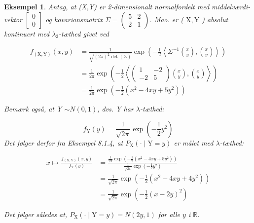 \documentclass{article}
\newcommand{\1}{\mathbbm{1}}
\theoremstyle{boxed}
\newtheorem{example}[theorem]{Eksempel}
\begin{document}
\begin{example}
    Antag, at (X,Y) er 2-dimensionalt normalfordelt med middelværdi-vektor $\left[\begin{array}{l}0 \\ 0\end{array}\right]$ og kovariansmatrix $\Sigma=\left(\begin{array}{ll}5 & 2 \\ 2 & 1\end{array}\right)$.
Mao. er ( $\mathrm{X}, \mathrm{Y}$ ) absolut kontinuert med $\lambda_2$-tæthed givet ved

$$
\begin{aligned}
f_{(\mathrm{X}, \mathrm{Y})}(x, y) & =\frac{1}{\sqrt{(2 \pi)^2 \operatorname{det}(\Sigma)}} \exp \left(-\frac{1}{2}\left\langle\Sigma^{-1}\binom{x}{y},\binom{x}{y}\right\rangle\right) \\
& =\frac{1}{2 \pi} \exp \left(-\frac{1}{2}\left\langle\left(\begin{array}{cc}
1 & -2 \\
-2 & 5
\end{array}\right)\binom{x}{y},\binom{x}{y}\right\rangle\right) \\
& =\frac{1}{2 \pi} \exp \left(-\frac{1}{2}\left(x^2-4 x y+5 y^2\right)\right)
\end{aligned}
$$


Bemærk også, at Y $\sim N(0,1)$, dvs. Y har $\lambda$-tæthed:

$$
f_{\mathrm{Y}}(y)=\frac{1}{\sqrt{2 \pi}} \exp \left(-\frac{1}{2} y^2\right)
$$
Det følger derfor fra Eksempel 8.1.4, at $P_{\mathrm{X}}(\cdot \mid \mathrm{Y}=y)$ er målet med $\lambda$-tæthed:

$$
\begin{aligned}
x \mapsto \frac{f_{(\mathrm{X}, \mathrm{Y})}(x, y)}{f_{\mathrm{Y}}(y)} & =\frac{\frac{1}{2 \pi} \exp \left(-\frac{1}{2}\left(x^2-4 x y+5 y^2\right)\right)}{\frac{1}{\sqrt{2 \pi}} \exp \left(-\frac{1}{2} y^2\right)} \\
& =\frac{1}{\sqrt{2 \pi}} \exp \left(-\frac{1}{2}\left(x^2-4 x y+4 y^2\right)\right) \\
& =\frac{1}{\sqrt{2 \pi}} \exp \left(-\frac{1}{2}(x-2 y)^2\right)
\end{aligned}
$$


Det følger således at, $P_{\mathrm{X}}(\cdot \mid \mathrm{Y}=y)=N(2 y, 1)$ for alle $y$ i $\mathbb{R}$.
\end{example}
\end{document}
